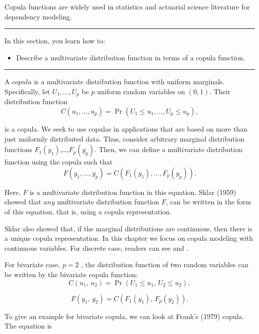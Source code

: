 \documentclass[]{book}
\providecommand{\tightlist}{%
  \setlength{\itemsep}{0pt}\setlength{\parskip}{0pt}}
\theoremstyle{definition}
\theoremstyle{definition}
\theoremstyle{definition}
\theoremstyle{remark}
\begin{document}
Copula functions are widely used in statistics and actuarial science
literature for dependency modeling.

\begin{center}\rule{0.5\linewidth}{\linethickness}\end{center}

In this section, you learn how to:

\begin{itemize}
\tightlist
\item
  Describe a multivariate distribution function in terms of a copula
  function.
\end{itemize}

\begin{center}\rule{0.5\linewidth}{\linethickness}\end{center}

A \(copula\) is a multivariate distribution function with uniform
marginals. Specifically, let \(U_1, \ldots, U_p\) be \(p\) uniform
random variables on \((0,1)\). Their distribution function
\[{C}(u_1, \ldots, u_p) = \Pr(U_1 \leq u_1, \ldots, U_p \leq u_p),\]

is a copula. We seek to use copulas in applications that are based on
more than just uniformly distributed data. Thus, consider arbitrary
marginal distribution functions \({F}_1(y_1)\),\ldots{},\({F}_p(y_p)\).
Then, we can define a multivariate distribution function using the
copula such that \[{F}(y_1, \ldots, y_p)= {C}({F}_1(y_1), \ldots,
{F}_p(y_p)).\]

Here, \(F\) is a multivariate distribution function in this equation.
Sklar (1959) showed that \(any\) multivariate distribution function
\(F\), can be written in the form of this equation, that is, using a
copula representation.

Sklar also showed that, if the marginal distributions are continuous,
then there is a unique copula representation. In this chapter we focus
on copula modeling with continuous variables. For discrete case, readers
can see \citep{joe2014dependence} and \citep{genest2007methods}.

For bivariate case, \(p=2\) , the distribution function of two random
variables can be written by the bivariate copula function:
\[{C}(u_1, \, u_2) = \Pr(U_1 \leq u_1, \, U_2 \leq
u_2),\]

\[{F}(y_1, \, y_2)= {C}({F}_1(y_1), \,
{F}_p(y_2)).\]

To give an example for bivariate copula, we can look at Frank's (1979)
copula. The equation is
\end{document}
